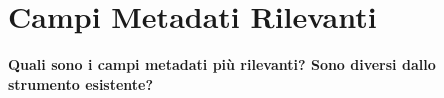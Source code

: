 \vspace{0.5cm}

\section{Campi Metadati Rilevanti}

\begin{tcolorbox}[colback=primaryColor!10,colframe=primaryColor,arc=2mm]
\large\textbf{Quali sono i campi metadati più rilevanti? Sono diversi dallo strumento esistente?}
\end{tcolorbox}

\vspace{0.3cm}

